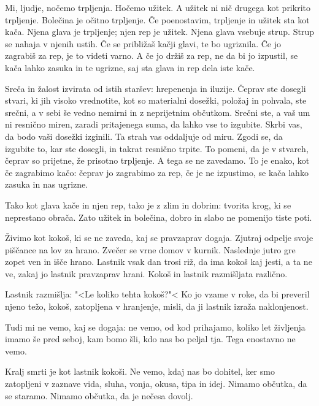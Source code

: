 \clearpage


Mi, ljudje, nočemo trpljenja. Hočemo užitek. A užitek ni nič drugega kot prikrito trpljenje. Bolečina je očitno trpljenje. Če poenostavim, trpljenje in užitek sta kot kača. Njena glava je trpljenje; njen rep je užitek. Njena glava vsebuje strup. Strup se nahaja v njenih ustih. Če se približaš kačji glavi, te bo ugriznila. Če jo zagrabiš za rep, je to videti varno. A če jo držiš za rep, ne da bi jo izpustil, se kača lahko zasuka in te ugrizne, saj sta glava in rep dela iste kače.

Sreča in žalost izvirata od istih staršev: hrepenenja in iluzije. Čeprav ste dosegli stvari, ki jih visoko vrednotite, kot so materialni dosežki, položaj in pohvala, ste srečni, a v sebi še vedno nemirni in z neprijetnim občutkom. Srečni ste, a vaš um ni resnično miren, zaradi pritajenega suma, da lahko vse to izgubite. Skrbi vas, da bodo vaši dosežki izginili. Ta strah vas oddaljuje od miru. Zgodi se, da izgubite to, kar ste dosegli, in takrat resnično trpite. To pomeni, da je v stvareh, čeprav so prijetne, že prisotno trpljenje. A tega se ne zavedamo. To je enako, kot če zagrabimo kačo: čeprav jo zagrabimo za rep, če je ne izpustimo, se kača lahko zasuka in nas ugrizne.

Tako kot glava kače in njen rep, tako je z zlim in dobrim: tvorita krog, ki se neprestano obrača. Zato užitek in bolečina, dobro in slabo ne pomenijo tiste poti.

\clearpage


Živimo kot kokoš, ki se ne zaveda, kaj se pravzaprav dogaja. Zjutraj odpelje svoje piščance na lov za hrano. Zvečer se vrne domov v kurnik. Naslednje jutro gre zopet ven in išče hrano. Lastnik vsak dan trosi riž, da ima kokoš kaj jesti, a ta ne ve, zakaj jo lastnik pravzaprav hrani. Kokoš in lastnik razmišljata različno.

Lastnik razmišlja: "<Le koliko tehta kokoš?"< Ko jo vzame v roke, da bi preveril njeno težo, kokoš, zatopljena v hranjenje, misli, da ji lastnik izraža naklonjenost.

Tudi mi ne vemo, kaj se dogaja: ne vemo, od kod prihajamo, koliko let življenja imamo še pred seboj, kam bomo šli, kdo nas bo peljal tja. Tega enostavno ne vemo.

Kralj smrti je kot lastnik kokoši. Ne vemo, kdaj nas bo dohitel, ker smo zatopljeni v zaznave vida, sluha, vonja, okusa, tipa in idej. Nimamo občutka, da se staramo. Nimamo občutka, da je nečesa dovolj.

